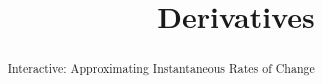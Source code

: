 \documentclass[handout]{ximera}
\title{Derivatives}
\begin{document}
\begin{abstract} Interactive: Approximating Instantaneous Rates of Change %
\end{abstract}

\maketitle

\end{document}
